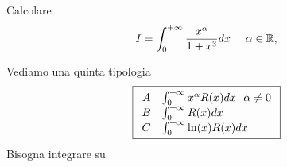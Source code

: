 Calcolare
\begin{equation*}
I = \int ^{ + \infty }_{0}\frac{x^{\alpha }}{1 + x^{3}} dx\ \ \ \ \alpha \in \RR  ,
\end{equation*}
\Esercizio{}

Vediamo una quinta tipologia
\begin{equation*}
\boxed{\begin{array}{ c l }
A & \int ^{ + \infty }_{0} x^{\alpha } R(x) dx\ \ \alpha \neq 0\\
B & \int ^{ + \infty }_{0} R(x) dx\\
C & \int ^{ + \infty }_{0}\ln(x) R(x) dx
\end{array}}
\end{equation*}
Bisogna integrare su


\begin{figure}[htpb]
	\centering
{} %

\begin{tikzpicture}[x = 0.75pt,y = 0.75pt,yscale = -1,xscale = 1]


\end{tikzpicture}
\end{figure}

